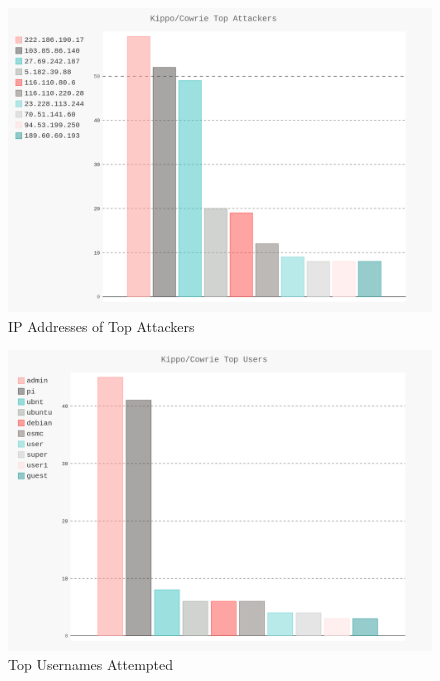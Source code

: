 \documentclass[a0,landscape]{a0poster}
\begin{document}
\begin{multicols}{3}
\begin{figure}[H]
	\begin{center}
		\includegraphics[width=20cm]{images/top_attackers.png}
		\caption{IP Addresses of Top Attackers}
	\end{center}
\end{figure} 

\begin{figure}[H]
	\begin{center}
		\includegraphics[width=20cm]{images/top_users.png}
		\caption{Top Usernames Attempted}
	\end{center}
\end{figure}


\end{multicols}
\end{document}

